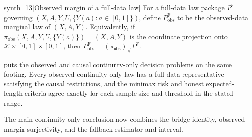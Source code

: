 \begin{definitionv}{synth_13}[Observed margin of a full-data law]
For a full-data law package $P^{\mathrm F}$ governing $(X,A,Y,U,\{Y(a):a\in[0,1]\})$, define $P^{\mathrm F}_{\mathrm{obs}}$ to be the observed-data marginal law of $(X,A,Y)$. Equivalently, if $\pi_{\mathrm{obs}}(X,A,Y,U,\{Y(a)\})=(X,A,Y)$ is the coordinate projection onto $\mathcal X\times[0,1]\times[0,1]$, then $P^{\mathrm F}_{\mathrm{obs}}=(\pi_{\mathrm{obs}})_{\#}P^{\mathrm F}$.
\end{definitionv}

 puts the observed and causal continuity-only decision problems on the same footing. Every observed continuity-only law has a full-data representative satisfying the causal restrictions, and the minimax risk and honest expected-length criteria agree exactly for each sample size and threshold in the stated range.

The main continuity-only conclusion now combines the bridge identity, observed-margin surjectivity, and the fallback estimator and interval.

